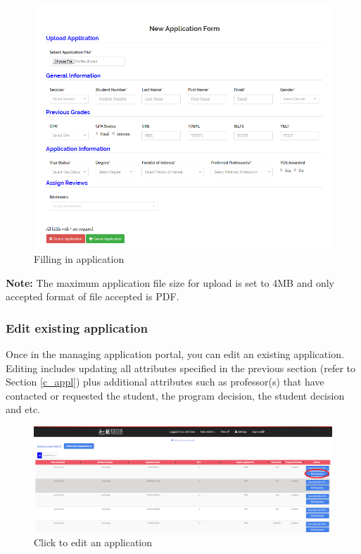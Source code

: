 \documentclass[fontsize=12pt,paper=letter,twoside]{scrartcl}
\begin{document}
\clearpage
\begin{figure}[!htb]
\begin{center}
\includegraphics[width=.99\textwidth]{images/adm/ma/fill_in_app.png}
\end{center}
\caption{Filling in application}
\label{fig:adm/fill_in_app}
\end{figure}

\smallskip
\noindent \textbf{Note:} The maximum application file size for upload is set to 4MB and only accepted format of file accepted is PDF.

\clearpage
\subsubsection{Edit existing application}
Once in the managing application portal, you can edit an existing application. Editing includes updating all attributes specified in the previous section (refer to Section \ref{c_appl}) plus additional attributes such as professor(s) that have contacted or requested the student, the program decision, the student decision and etc.

\begin{figure}[!htb]
\begin{center}
\includegraphics[width=.99\textwidth]{images/adm/ma/edit_appl.png}
\end{center}
\caption{Click to edit an application}
\label{fig:adm/edit_appl}
\end{figure}
\end{document}
